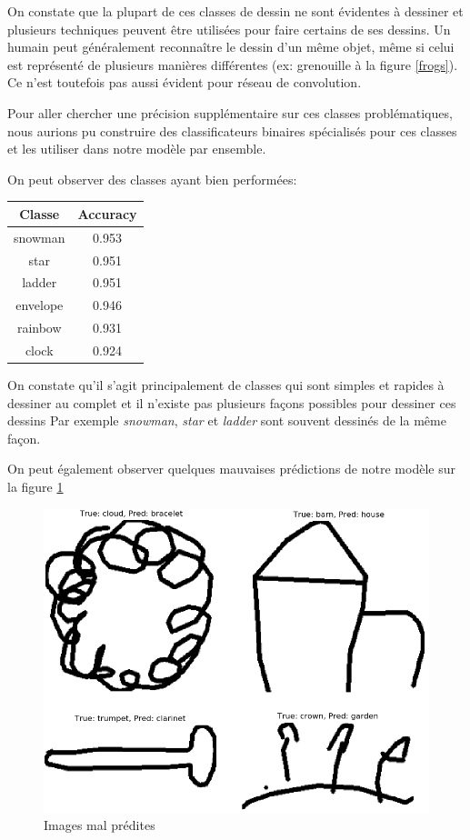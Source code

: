 On constate que la plupart de ces classes de dessin ne sont évidentes à dessiner et plusieurs techniques peuvent être utilisées pour faire certains de ses dessins. 
Un humain peut généralement reconnaître le dessin d'un même objet, même si celui est représenté de plusieurs manières différentes (ex: grenouille à la figure \ref{frogs}). 
Ce n'est toutefois pas aussi évident pour réseau de convolution.

Pour aller chercher une précision supplémentaire sur ces classes problématiques, nous aurions pu construire des classificateurs binaires spécialisés pour ces classes et les utiliser dans notre modèle par ensemble.

On peut observer des classes ayant bien performées: 

\begin{center}
\begin{tabular}{|c|c|}
\hline
\textbf{Classe} & \textbf{Accuracy} \\ \hline
snowman & 0.953 \\ \hline
star & 0.951 \\ \hline
ladder & 0.951 \\ \hline
envelope & 0.946 \\ \hline
rainbow & 0.931 \\ \hline
clock & 0.924 \\ \hline
\end{tabular}
\end{center}


On constate qu'il s'agit principalement de classes qui sont simples et rapides à dessiner au complet et il n'existe pas plusieurs façons possibles pour dessiner ces dessins
Par exemple \emph{snowman}, \emph{star} et \emph{ladder} sont souvent dessinés de la même façon.


On peut également observer quelques mauvaises prédictions de notre modèle sur la figure \ref{comborate}

\begin{figure}[h]
	\includegraphics[width=\linewidth]{images/combo_rate.png} %
	\caption{Images mal prédites} %
	\label{comborate} 
\end{figure}

